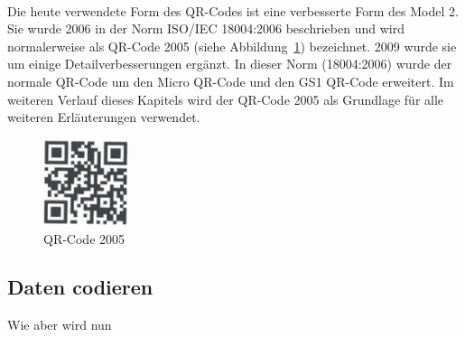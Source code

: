 ~\\
Die heute verwendete Form des QR-Codes ist eine verbesserte Form des Model 2. 
Sie wurde 2006 in der Norm ISO/IEC 18004:2006 beschrieben und wird normalerweise als QR-Code 2005 (siehe Abbildung~\ref{fig:qr2005}) bezeichnet. 
2009 wurde sie um einige Detailverbesserungen ergänzt. 
In dieser Norm (18004:2006) wurde der normale QR-Code um den Micro QR-Code und den GS1 QR-Code erweitert. \pagebreak
Im weiteren Verlauf dieses Kapitels wird der QR-Code 2005 als Grundlage für alle weiteren Erläuterungen verwendet.

\begin{figure}[htbp]
	\centering
	\includegraphics[width=2.5cm]{Bilder/QR_Code_2005.png}
	\caption[QR-Code 2005]{QR-Code 2005\footnotemark}
	\label{fig:qr2005}
	\hfill
\end{figure}

\subsection{Daten codieren}
Wie aber wird nun 

\pagebreak
